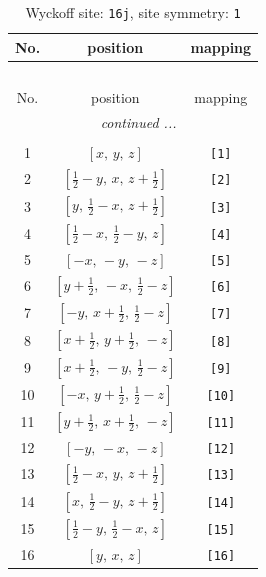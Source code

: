 \documentclass[fleqn,8pt]{jsarticle}
\begin{document}
\begin{longtable}{ccc}
\caption{Wyckoff site: {\tt 16j}, site symmetry: {\tt 1}}
 \\
 \hline \hline
No. & position & mapping \\ \hline \endfirsthead

\multicolumn{2}{l}{\tablename\ \thetable{}} \\
 \hline \hline
No. & position & mapping \\ \hline \endhead

 \hline \hline
\multicolumn{2}{r}{\footnotesize\it continued ...} \\ \endfoot

 \hline \hline
\multicolumn{2}{r}{} \\ \endlastfoot

1 & $\left[ x,\, y,\, z \right]$ & {\tt [1]} \\ \hline
2 & $\left[ \frac{1}{2} - y,\, x,\, z + \frac{1}{2} \right]$ & {\tt [2]} \\ \hline
3 & $\left[ y,\, \frac{1}{2} - x,\, z + \frac{1}{2} \right]$ & {\tt [3]} \\ \hline
4 & $\left[ \frac{1}{2} - x,\, \frac{1}{2} - y,\, z \right]$ & {\tt [4]} \\ \hline
5 & $\left[ - x,\, - y,\, - z \right]$ & {\tt [5]} \\ \hline
6 & $\left[ y + \frac{1}{2},\, - x,\, \frac{1}{2} - z \right]$ & {\tt [6]} \\ \hline
7 & $\left[ - y,\, x + \frac{1}{2},\, \frac{1}{2} - z \right]$ & {\tt [7]} \\ \hline
8 & $\left[ x + \frac{1}{2},\, y + \frac{1}{2},\, - z \right]$ & {\tt [8]} \\ \hline
9 & $\left[ x + \frac{1}{2},\, - y,\, \frac{1}{2} - z \right]$ & {\tt [9]} \\ \hline
10 & $\left[ - x,\, y + \frac{1}{2},\, \frac{1}{2} - z \right]$ & {\tt [10]} \\ \hline
11 & $\left[ y + \frac{1}{2},\, x + \frac{1}{2},\, - z \right]$ & {\tt [11]} \\ \hline
12 & $\left[ - y,\, - x,\, - z \right]$ & {\tt [12]} \\ \hline
13 & $\left[ \frac{1}{2} - x,\, y,\, z + \frac{1}{2} \right]$ & {\tt [13]} \\ \hline
14 & $\left[ x,\, \frac{1}{2} - y,\, z + \frac{1}{2} \right]$ & {\tt [14]} \\ \hline
15 & $\left[ \frac{1}{2} - y,\, \frac{1}{2} - x,\, z \right]$ & {\tt [15]} \\ \hline
16 & $\left[ y,\, x,\, z \right]$ & {\tt [16]} \\
\end{longtable}
\end{document}
